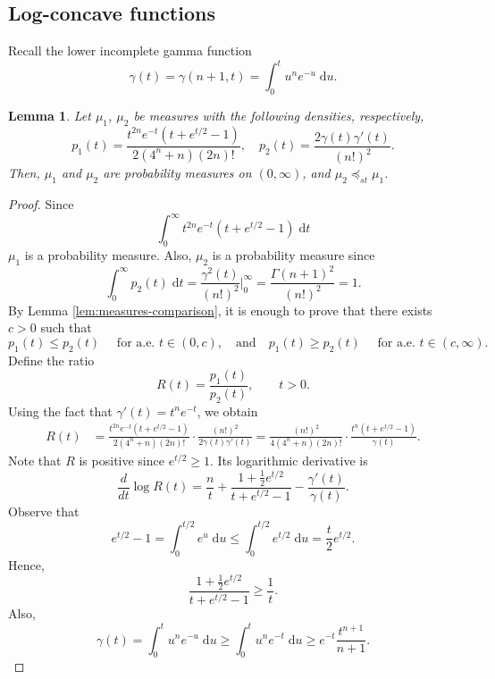 \documentclass[11pt]{amsart}
\theoremstyle{plain}
\newtheorem{lemma}[theorem]{Lemma}
\theoremstyle{definition}
\theoremstyle{remark}
\begin{document}
\subsection{Log-concave functions}
        Recall the lower incomplete gamma function
        \[
            \gamma(t) = \gamma(n+1, t) = \int_0^t u^{n} e^{-u} \;\mathrm d u.
        \]
\begin{lemma} \label{lem:stoc-1}
    Let $\mu_1$, $\mu_2$ be measures with the following densities, respectively,
    \[
        p_1 (t) = \frac{t^{2n}e^{-t}(t +e^{t / 2}-1)}{2(4^n+n)(2n)!}, \quad p_2 (t) = \frac{2 \gamma(t) \gamma '(t)}{(n!)^2}.
    \]
    Then, $\mu_1$ and $\mu_2$ are probability measures on $(0,\infty)$, and $\mu_2  \preceq_{st} \mu_1$.
\end{lemma}
\begin{proof}
    Since
        $$
            \int_0^\infty t^{2n}e^{-t}(t +e^{t / 2}-1)\;\mathrm  d t
        $$
        $\mu_1$ is a probability measure.
        Also, $\mu_2$ is a probability measure since
        \[
            \int_0^\infty p_2(t) \;\mathrm dt= \frac{\gamma^2(t)}{(n!)^2} \Bigg|_0^\infty = \frac{\Gamma(n+1)^2}{ (n!)^2}  =1.
        \]
        By Lemma \ref{lem:measures-comparison}, it is enough to prove that there exists $c>0$ such that
        $$
        p_1(t) \leq p_2(t) \quad \text { for a.e. } t \in(0, c),
        \quad \text{and} \quad
        p_1(t) \geq p_2(t) \quad \text { for a.e. } t \in(c, \infty) .
        $$
        Define the ratio
        \[
            R (t) = \frac{p_1(t)}{p_2(t)}, \qquad t >0
            .
        \]
        Using the fact that $ \gamma ' (t) = t^ne^{-t}$, we obtain
        \begin{align}
            R (t) &= \frac{t^{2n}e^{-t}(t +e^{t / 2}-1)}{2(4^n+n)(2n)!} \cdot \frac{(n!)^2}{2 \gamma(t) \gamma '(t)}
            = \frac{(n!)^2}{4(4^n+n)(2n)!} \cdot \frac{t^{n}(t +e^{t / 2}-1)}{\gamma(t) }
            .
        \end{align}
        Note that $R$ is positive since $e^{t/2} \geq 1$. Its logarithmic derivative is
        $$
        \frac{d}{d t} \log R(t)=\frac{n}{t} +\frac{1+\frac{1}{2} e^{t / 2}}{t+e^{t / 2}-1} -\frac{\gamma'(t)}{\gamma(t)}.
        $$
        Observe that
        \[
            e^{t / 2}-1=\int_0^{t / 2} e^u \;\mathrm  d u \leq \int_0^{t / 2} e^{t/2} \;\mathrm d u = \frac{t}{2}e^{t/2}.
        \]
        Hence,
        $$
            \frac{1+\frac{1}{2} e^{t / 2}}{t+e^{t / 2}-1} \geq \frac{1}{t}.
        $$
        Also,
        \[
            \gamma(t) = \int_0^t u^n e^{-u}  \;\mathrm d u \geq \int_0^t u^n e^{-t}  \;\mathrm d u \geq e^{-t} \frac{t^{n+1}}{n+1}.
\]
\end{proof}
\end{document}
